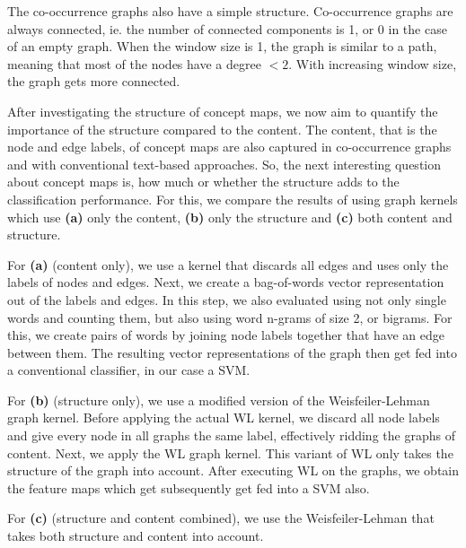 The co-occurrence graphs also have a simple structure.
Co-occurrence graphs are always connected, ie. the number of connected components is 1, or 0 in the case of an empty graph.
When the window size is 1, the graph is similar to a path, meaning that most of the nodes have a degree $< 2$. With increasing window size, the graph gets more connected.

After investigating the structure of concept maps, we now aim to quantify the importance of the structure compared to the content.
The content, that is the node and edge labels, of concept maps are also captured in co-occurrence graphs and with conventional text-based approaches. So, the next interesting question about concept maps is, how much or whether the structure adds to the classification performance.
For this, we compare the results of using graph kernels which use \textbf{(a)} only the content, \textbf{(b)} only the structure and \textbf{(c)} both content and structure.

For \textbf{(a)} (content only), we use a kernel that discards all edges and uses only the labels of nodes and edges. Next, we create a bag-of-words vector representation out of the labels and edges.
In this step, we also evaluated using not only single words and counting them, but also using word n-grams of size 2, or bigrams.
For this, we create pairs of words by joining node labels together that have an edge between them.
The resulting vector representations of the graph then get fed into a conventional classifier, in our case a SVM.

For \textbf{(b)} (structure only), we use a modified version of the Weisfeiler-Lehman graph kernel. Before applying the actual WL kernel, we discard all node labels and give every node in all graphs the same label, effectively ridding the graphs of content. Next, we apply the WL graph kernel. This variant of WL only takes the structure of the graph into account.
After executing WL on the graphs, we obtain the feature maps which get subsequently get fed into a SVM also.

For \textbf{(c)} (structure and content combined), we use the Weisfeiler-Lehman that takes both structure and content into account.

